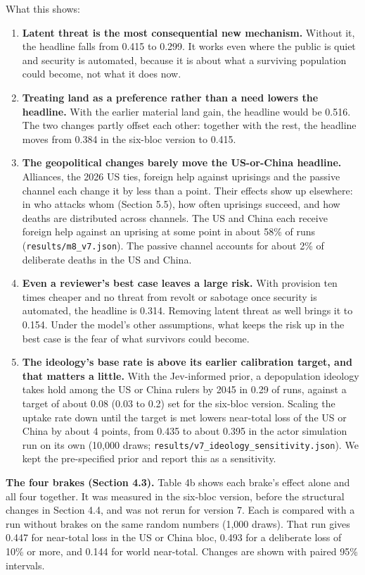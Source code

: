 \documentclass[
  10pt,
]{article}
\providecommand{\tightlist}{%
  \setlength{\itemsep}{0pt}\setlength{\parskip}{0pt}}
\begin{document}
What this shows:

\begin{enumerate}
\def\labelenumi{\arabic{enumi}.}
\tightlist
\item
  \textbf{Latent threat is the most consequential new mechanism.} Without it, the headline falls
  from 0.415 to 0.299. It works even where the public is quiet and security is automated, because it
  is about what a surviving population could become, not what it does now.
\item
  \textbf{Treating land as a preference rather than a need lowers the headline.} With the earlier
  material land gain, the headline would be 0.516. The two changes partly offset each other:
  together with the rest, the headline moves from 0.384 in the six-bloc version to 0.415.
\item
  \textbf{The geopolitical changes barely move the US-or-China headline.} Alliances, the 2026 US
  ties, foreign help against uprisings and the passive channel each change it by less than a point.
  Their effects show up elsewhere: in who attacks whom (Section 5.5), how often uprisings succeed,
  and how deaths are distributed across channels. The US and China each receive foreign help against
  an uprising at some point in about 58\% of runs (\texttt{results/m8\_v7.json}). The passive
  channel accounts for about 2\% of deliberate deaths in the US and China.
\item
  \textbf{Even a reviewer's best case leaves a large risk.} With provision ten times cheaper and no
  threat from revolt or sabotage once security is automated, the headline is 0.314. Removing latent
  threat as well brings it to 0.154. Under the model's other assumptions, what keeps the risk up in
  the best case is the fear of what survivors could become.
\item
  \textbf{The ideology's base rate is above its earlier calibration target, and that matters a
  little.} With the Jev-informed prior, a depopulation ideology takes hold among the US or China
  rulers by 2045 in 0.29 of runs, against a target of about 0.08 (0.03 to 0.2) set for the six-bloc
  version. Scaling the uptake rate down until the target is met lowers near-total loss of the US or
  China by about 4 points, from 0.435 to about 0.395 in the actor simulation run on its own (10,000
  draws; \texttt{results/v7\_ideology\_sensitivity.json}). We kept the pre-specified prior and
  report this as a sensitivity.
\end{enumerate}

\textbf{The four brakes (Section 4.3).} Table 4b shows each brake's effect alone and all four
together. It was measured in the six-bloc version, before the structural changes in Section 4.4, and
was not rerun for version 7. Each is compared with a run without brakes on the same random numbers
(1,000 draws). That run gives 0.447 for near-total loss in the US or China bloc, 0.493 for a
deliberate loss of 10\% or more, and 0.144 for world near-total. Changes are shown with paired 95\%
intervals.
\end{document}
